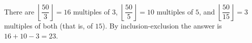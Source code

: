 There are $\left\lfloor\dfrac{50}{3}\right\rfloor=16$ multiples of $3$, $\left\lfloor\dfrac{50}{5}\right\rfloor=10$ multiples of $5$, and $\left\lfloor\dfrac{50}{15}\right\rfloor=3$ multiples of both (that is, of $15$). By inclusion-exclusion the answer is $16+10-3=\boxed{23}$.
